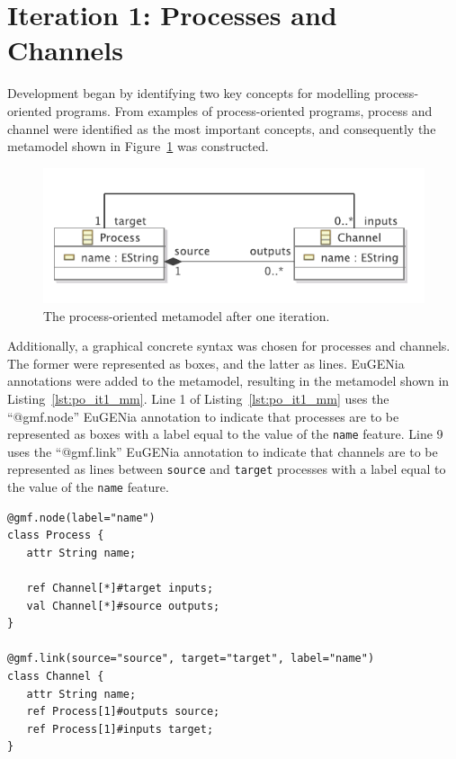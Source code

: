\section{Iteration 1: Processes and Channels}
Development began by identifying two key concepts for modelling process-oriented programs. From examples of process-oriented programs, process and channel were identified as the most important concepts, and consequently the metamodel shown in Figure~\ref{fig:po_it1_mm} was constructed.


\begin{figure}[htbp]
	\centering
		\includegraphics[scale=0.75]{A.2.ProcessOriented/images/1_mm.pdf}
	\caption{The process-oriented metamodel after one iteration.}
	\label{fig:po_it1_mm}
\end{figure}

Additionally, a graphical concrete syntax was chosen for processes and channels. The former were represented as boxes, and the latter as lines. EuGENia annotations were added to the metamodel, resulting in the metamodel shown in Listing~\ref{lst:po_it1_mm}. Line 1 of Listing~\ref{lst:po_it1_mm} uses the ``@gmf.node'' EuGENia annotation to indicate that processes are to be represented as boxes with a label equal to the value of the \texttt{name} feature. Line 9 uses the ``@gmf.link'' EuGENia annotation to indicate that channels are to be represented as lines between \texttt{source} and \texttt{target} processes with a label equal to the value of the \texttt{name} feature. 

\begin{lstlisting}[caption=The annotated process-oriented metamodel after one iteration, label=lst:po_it1_mm, language=Emfatic]
@gmf.node(label="name")
class Process {
   attr String name;
      
   ref Channel[*]#target inputs;
   val Channel[*]#source outputs; 
}

@gmf.link(source="source", target="target", label="name")
class Channel { 
   attr String name;
   ref Process[1]#outputs source;
   ref Process[1]#inputs target;
} 

\end{lstlisting}


